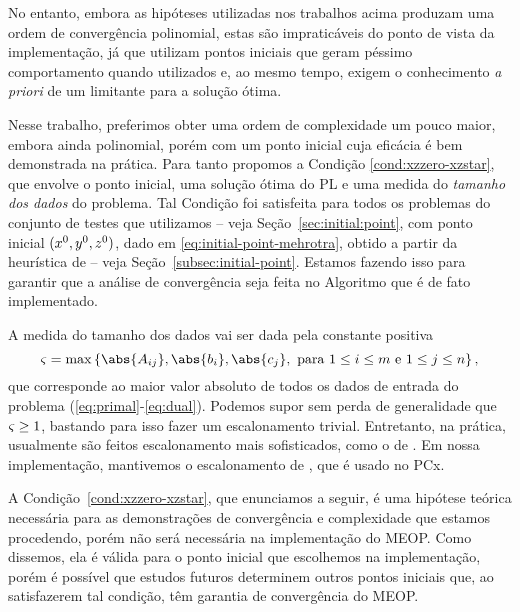 No entanto, embora as hipóteses  utilizadas nos trabalhos acima produzam uma ordem de convergência  polinomial, estas são impraticáveis do ponto de vista da implementação, já que utilizam pontos iniciais que geram péssimo comportamento quando utilizados e, ao mesmo tempo, exigem o conhecimento \emph{a priori}  de um limitante para a solução  ótima. 

Nesse trabalho, preferimos  obter uma ordem de complexidade um pouco maior, embora ainda polinomial, porém com um ponto inicial cuja eficácia é bem demonstrada na prática. Para tanto propomos a Condição \ref{cond:xzzero-xzstar},  que envolve o ponto inicial, uma solução ótima do PL e uma medida do \emph{tamanho dos dados} do problema. Tal Condição foi satisfeita para todos os problemas do conjunto de testes que utilizamos  -- veja Seção~\ref{sec:initial:point}, com
ponto inicial $(x^0,y^0,z^0)$, dado em \eqref{eq:initial-point-mehrotra}, obtido a partir da heurística de \textcite{Mehrotra:1992wr} -- veja Seção~\ref{subsec:initial-point}. Estamos fazendo isso para garantir que a análise de convergência seja feita no  Algoritmo que é de fato implementado. 


A medida do tamanho dos dados vai ser dada pela constante positiva 
\begin{equation}
	\label{eq:max-norm-data}
 	\bdxzstar = \max\left\{\abs{A_{ij}},\abs{b_{i}},\abs{c_{j}}, \text{ para } 1\leq i\leq m \text{ e } 1\leq j \leq n  \right\},
\end{equation}
que corresponde ao maior valor absoluto de todos os dados de entrada do problema (\ref{eq:primal}-\ref{eq:dual}). Podemos supor sem perda de generalidade que $\varsigma \geq  1$,  bastando para isso fazer um escalonamento trivial. Entretanto, na prática, usualmente são feitos escalonamento mais sofisticados, como o de \textcite{Curtis:1972cp}. Em nossa implementação, mantivemos o escalonamento de \citeauthor{Curtis:1972cp}, que é  usado no PCx.


A Condição~\ref{cond:xzzero-xzstar}, que enunciamos a seguir, é uma hipótese teórica necessária para as demonstrações de convergência e complexidade que estamos procedendo, porém não será necessária na implementação do MEOP. Como dissemos, ela é válida para o ponto inicial que escolhemos na implementação, porém é possível que estudos futuros determinem outros pontos iniciais que, ao
satisfazerem tal condição, têm garantia de convergência do MEOP.




